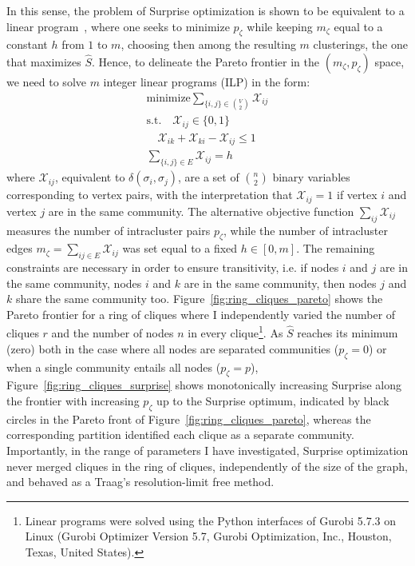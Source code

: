 In this sense, the problem of Surprise optimization is shown to be equivalent to a linear program~\cite{fleck2014}, where one seeks to minimize $p_\zeta$ while keeping $m_\zeta$ equal to a constant $h$ from $1$ to $m$, choosing then among the resulting $m$ clusterings, the one that maximizes $\hat{S}$.
Hence, to delineate the Pareto frontier in the $(m_\zeta,p_\zeta)$ space, we need to solve $m$ integer linear programs (ILP) in the form:
\begin{align}\label{eq:surprise_ilp}
\textrm{minimize} \sum_{\{i,j\} \in \binom{V}{2}} \mathcal{X}_{ij} \nonumber \\
\textrm{s.t.} \quad \mathcal{X}_{ij} \in \{0,1 \} \nonumber \\
\quad \mathcal{X}_{ik} + \mathcal{X}_{ki} - \mathcal{X}_{ij} \leq 1 \nonumber \\
\sum_{\{i,j\} \in E} \mathcal{X}_{ij}=h \nonumber
\end{align}
where $\mathcal{X}_{ij}$, equivalent to $\delta(\sigma_i, \sigma_j)$, are a set of $\binom{n}{2}$ binary variables corresponding to vertex pairs, with the interpretation that $\mathcal{X}_{ij}=1$ if vertex $i$ and vertex $j$ are in the same community. The alternative objective function $\sum_{ij}\mathcal{X}_{ij}$ measures the number of intracluster pairs $p_\zeta$, while the number of intracluster edges $m_\zeta=\sum_{ij \in E} \mathcal{X}_{ij}$ was set equal to a fixed $h \in [0,m]$. The remaining constraints are necessary in order to ensure transitivity, i.e. if nodes $i$ and $j$ are in the same community, nodes $i$ and $k$ are in the same community, then nodes $j$ and $k$ share the same community too. 
Figure~\ref{fig:ring_cliques_pareto} shows the Pareto frontier for a ring of cliques where I independently varied the number of cliques $r$ and the number of nodes $n$ in every clique\footnote{Linear programs were solved using the Python interfaces of Gurobi 5.7.3 on Linux (Gurobi Optimizer Version 5.7, Gurobi Optimization, Inc., Houston, Texas, United States).}.
As $\hat{S}$ reaches its minimum (zero) both in the case where all nodes are separated communities ($p_\zeta=0$) or when a single community entails all nodes ($p_\zeta=p$), Figure~\ref{fig:ring_cliques_surprise} shows monotonically increasing Surprise along the frontier with increasing $p_\zeta$ up to the Surprise optimum, indicated by black circles in the Pareto front of Figure~\ref{fig:ring_cliques_pareto}, whereas the corresponding partition identified each clique as a separate community.
Importantly, in the range of parameters I have investigated, Surprise optimization never merged cliques in the ring of cliques, independently of the size of the graph, and behaved as a Traag's resolution-limit free method.

